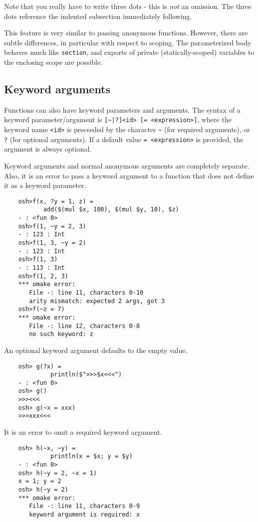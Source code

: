 Note that you really have to write three dots - this is {\it not} an omission.
The three dots reference the indented subsection immediately following.

This feature is very similar to passing anonymous functions. However, there
are subtle differences, in particular with respect to scoping. The
parameterized body behaves much like \verb+section+, and exports of
private (statically-scoped) variables to the enclosing scope are possible.


\subsection{Keyword arguments}
\label{section:keyword-arguments}

\newinkeyword

Functions can also have keyword parameters and arguments.  The syntax of a keyword
parameter/argument is \verb+[~|?]<id> [= <expression>]+, where the keyword name \verb+<id>+
is preceeded by the character \verb+~+ (for required arguments), or \verb+?+ (for optional
arguments).  If a default value \verb+= <expression>+ is provided, the argument is
always optional.

Keyword arguments and normal anonymous arguments are completely separate.  Also, it is an error to
pass a keyword argument to a function that does not define it as a keyword parameter.

\begin{verbatim}
    osh>f(x, ?y = 1, z) =
           add($(mul $x, 100), $(mul $y, 10), $z)
    - : <fun 0>
    osh>f(1, ~y = 2, 3)
    - : 123 : Int
    osh>f(1, 3, ~y = 2)
    - : 123 : Int
    osh>f(1, 3)
    - : 113 : Int
    osh>f(1, 2, 3)
    *** omake error:
       File -: line 11, characters 0-10
       arity mismatch: expected 2 args, got 3
    osh>f(~z = 7)
    *** omake error:
       File -: line 12, characters 0-8
       no such keyword: z
\end{verbatim}

An optional keyword argument defaults to the empty value.

\begin{verbatim}
    osh> g(?x) =
             println($">>>$x<<<")
    - : <fun 0>
    osh> g()
    >>><<<
    osh> g(~x = xxx)
    >>>xxx<<<
\end{verbatim}

It is an error to omit a required keyword argument.

\begin{verbatim}
    osh> h(~x, ~y) =
             println(x = $x; y = $y)
    - : <fun 0>
    osh> h(~y = 2, ~x = 1)
    x = 1; y = 2
    osh> h(~y = 2)
    *** omake error:
       File -: line 11, characters 0-9
       keyword argument is required: x
\end{verbatim}

